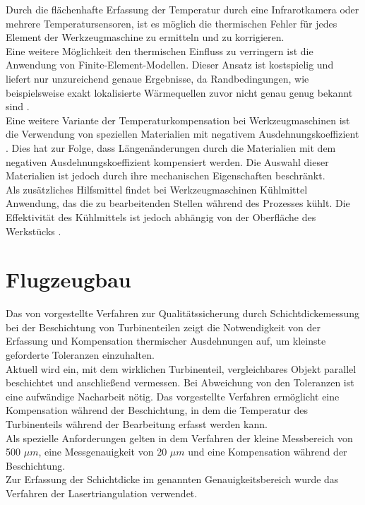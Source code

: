 Durch die flächenhafte Erfassung der Temperatur durch eine Infrarotkamera oder mehrere Temperatursensoren, ist es möglich die thermischen Fehler für jedes Element der Werkzeugmaschine zu ermitteln und zu korrigieren.\\
Eine weitere Möglichkeit den thermischen Einfluss zu verringern ist die Anwendung von Finite-Element-Modellen. Dieser Ansatz ist kostspielig und liefert nur unzureichend genaue Ergebnisse, da Randbedingungen, wie beispielsweise exakt lokalisierte Wärmequellen zuvor nicht genau genug bekannt sind \cite{yuan1998}.\\
Eine weitere Variante der Temperaturkompensation bei Werkzeugmaschinen ist die Verwendung von speziellen Materialien mit negativem Ausdehnungskoeffizient \cite{Mayr2012}. Dies hat zur Folge, dass Längenänderungen durch die Materialien mit dem negativen Ausdehnungskoeffizient kompensiert werden. Die Auswahl dieser Materialien ist jedoch durch ihre mechanischen Eigenschaften beschränkt. \\
Als zusätzliches Hilfsmittel findet bei Werkzeugmaschinen Kühlmittel Anwendung, das die zu bearbeitenden Stellen während des Prozesses kühlt. Die Effektivität des Kühlmittels ist jedoch abhängig von der Oberfläche des Werkstücks \cite{Mayr2012}. 


\section{Flugzeugbau}\label{sec:flugzeugbau}

Das von \cite{gindorf} vorgestellte Verfahren zur Qualitätssicherung durch Schichtdickemessung bei der Beschichtung von Turbinenteilen zeigt die Notwendigkeit von der Erfassung und Kompensation thermischer Ausdehnungen auf, um kleinste geforderte Toleranzen einzuhalten.\\
Aktuell wird ein, mit dem wirklichen Turbinenteil, vergleichbares Objekt parallel beschichtet und anschließend vermessen. Bei Abweichung von den Toleranzen ist eine aufwändige Nacharbeit nötig. Das vorgestellte Verfahren ermöglicht eine Kompensation während der Beschichtung, in dem die Temperatur des Turbinenteils während der Bearbeitung erfasst werden kann.\\
Als spezielle Anforderungen gelten in dem Verfahren der kleine Messbereich von 500 $\mu m$, eine Messgenauigkeit von 20 $\mu m$ und eine Kompensation während der Beschichtung.\\
Zur Erfassung der Schichtdicke im genannten Genauigkeitsbereich wurde das Verfahren der Lasertriangulation verwendet. 

